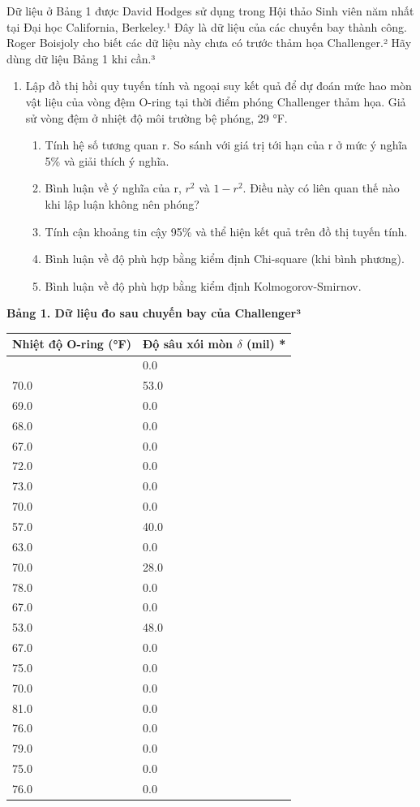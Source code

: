 Dữ liệu ở Bảng 1 được David Hodges sử dụng trong Hội thảo Sinh viên năm nhất tại Đại học California, Berkeley.¹ Đây là dữ liệu của các chuyến bay thành công. Roger Boisjoly cho biết các dữ liệu này chưa có trước thảm họa Challenger.² Hãy dùng dữ liệu Bảng 1 khi cần.³

\begin{enumerate}
\def\labelenumi{\arabic{enumi}.}
\item
  Lập đồ thị hồi quy tuyến tính và ngoại suy kết quả để dự đoán mức hao mòn vật liệu của vòng đệm O-ring tại thời điểm phóng Challenger thảm họa. Giả sử vòng đệm ở nhiệt độ môi trường bệ phóng, 29 °F.

  \begin{enumerate}
  \def\labelenumii{\alph{enumii}.}
    \item
    Tính hệ số tương quan r. So sánh với giá trị tới hạn của r ở mức ý nghĩa 5\% và giải thích ý nghĩa.
  \item
    Bình luận về ý nghĩa của r, \(r^2\) và \(1-r^2\). Điều này có liên quan thế nào khi lập luận không nên phóng?
  \item
    Tính cận khoảng tin cậy 95\% và thể hiện kết quả trên đồ thị tuyến tính.
  \item
    Bình luận về độ phù hợp bằng kiểm định Chi-square (khi bình phương).
  \item
    Bình luận về độ phù hợp bằng kiểm định Kolmogorov-Smirnov.
  \end{enumerate}
\end{enumerate}

\textbf{Bảng 1. Dữ liệu đo sau chuyến bay của Challenger³}

{\small
\begin{longtable}[]{@{}ll@{}}
\toprule\noalign{}
Nhiệt độ O-ring (°F) & Độ sâu xói mòn \ensuremath{\delta} (mil) * \\
\midrule\noalign{}
\endhead
\bottomrule\noalign{}
\endlastfoot
66.0 & 0.0 \\
70.0 & 53.0 \\
69.0 & 0.0 \\
68.0 & 0.0 \\
67.0 & 0.0 \\
72.0 & 0.0 \\
73.0 & 0.0 \\
70.0 & 0.0 \\
57.0 & 40.0 \\
63.0 & 0.0 \\
70.0 & 28.0 \\
78.0 & 0.0 \\
67.0 & 0.0 \\
53.0 & 48.0 \\
67.0 & 0.0 \\
75.0 & 0.0 \\
70.0 & 0.0 \\
81.0 & 0.0 \\
76.0 & 0.0 \\
79.0 & 0.0 \\
75.0 & 0.0 \\
76.0 & 0.0 \\
\end{longtable}
}

